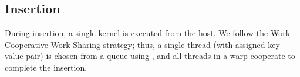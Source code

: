 \subsection{Insertion}

During insertion, a single kernel is executed from the host. We follow the Work Cooperative Work-Sharing strategy; thus, a single thread (with assigned key-value pair) is chosen from a queue using , and all threads in a warp cooperate to complete the insertion.

